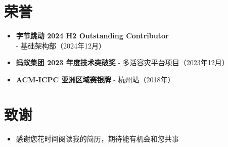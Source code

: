 \documentclass{resume}
\begin{document}
\section{荣誉}
\begin{itemize}
      \item \textbf{字节跳动 2024 H2 Outstanding Contributor} - 基础架构部（2024年12月）
      \item \textbf{蚂蚁集团 2023 年度技术突破奖} - 多活容灾平台项目（2023年12月）
      \item \textbf{ACM-ICPC 亚洲区域赛银牌} - 杭州站（2018年）
\end{itemize}

\section{致谢}
\begin{itemize}
      \item 感谢您花时间阅读我的简历，期待能有机会和您共事
\end{itemize}
\end{document}
